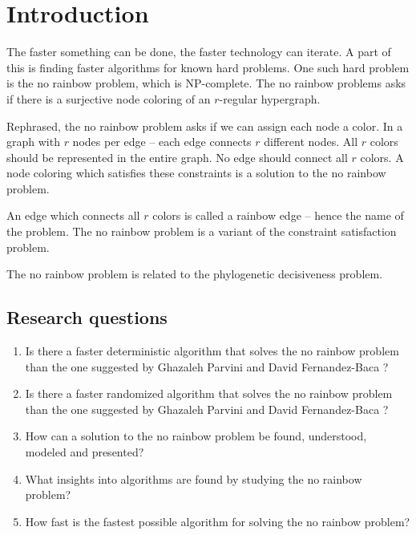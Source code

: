 \chapter{Introduction}
The faster something can be done, the faster technology can iterate.
A part of this is finding faster algorithms for known hard problems.
One such hard problem is the no rainbow problem, which is NP-complete.
The no rainbow problems asks if there is a surjective node coloring of an $r$-regular hypergraph.
\cite{sourceNoRainbow}

Rephrased, the no rainbow problem asks if we can assign each node a color.
In a graph with $r$ nodes per edge -- each edge connects $r$ different nodes.
All $r$ colors should be represented in the entire graph.
No edge should connect all $r$ colors.
A node coloring which satisfies these constraints is a solution to the no rainbow problem.

An edge which connects all $r$ colors is called a rainbow edge -- hence the name of the problem.
The no rainbow problem is a variant of the constraint satisfaction problem.

The no rainbow problem is related to the phylogenetic decisiveness problem. \cite{sourcePhylogeneticDecisiveness}

\section{Research questions}
\begin{enumerate}
  \item Is there a faster deterministic algorithm that solves the no rainbow problem than the one suggested by Ghazaleh Parvini and David Fernandez-Baca \cite{sourceNoRainbow}?
  \item Is there a faster randomized algorithm that solves the no rainbow problem than the one suggested by Ghazaleh Parvini and David Fernandez-Baca \cite{sourceNoRainbow}?
  \item How can a solution to the no rainbow problem be found, understood, modeled and presented?
  \item What insights into algorithms are found by studying the no rainbow problem?
  \item How fast is the fastest possible algorithm for solving the no rainbow problem? 
\end{enumerate}
